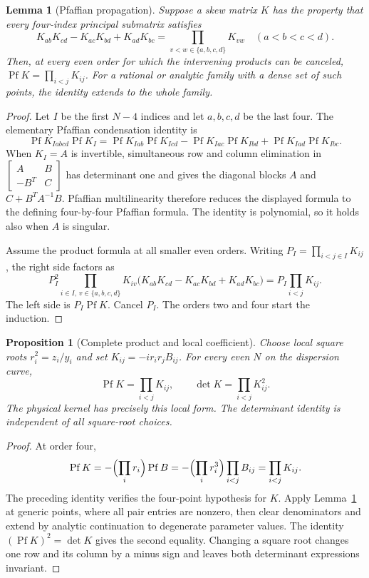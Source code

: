 \documentclass[11pt]{article}
\numberwithin{equation}{section}
\newtheorem{lemma}[theorem]{Lemma}
\newtheorem{proposition}[theorem]{Proposition}
\theoremstyle{remark}\newtheorem{remark}[theorem]{Remark}
\DeclareMathOperator{\Pf}{Pf}
\begin{document}
\begin{lemma}[Pfaffian propagation]\label{lem:pf-propagation}
Suppose a skew matrix $K$ has the property that every four-index
principal submatrix satisfies
\[
 K_{ab}K_{cd}-K_{ac}K_{bd}+K_{ad}K_{bc}
   =\prod_{v<w\in\{a,b,c,d\}}K_{vw}
 \quad(a<b<c<d).
\]
Then, at every even order for which the intervening products
can be canceled, $\operatorname{Pf}K=\prod_{i<j}K_{ij}$.
For a rational or analytic family with a dense set of such
points, the identity extends to the whole family.
\end{lemma}
\begin{proof}
Let $I$ be the first $N-4$ indices and let $a,b,c,d$ be the last
four.  The elementary Pfaffian condensation identity is
\[
 \operatorname{Pf}K_{Iabcd}\operatorname{Pf}K_I
 =\operatorname{Pf}K_{Iab}\operatorname{Pf}K_{Icd}
  -\operatorname{Pf}K_{Iac}\operatorname{Pf}K_{Ibd}
  +\operatorname{Pf}K_{Iad}\operatorname{Pf}K_{Ibc}.
\]
When $K_I=A$ is invertible, simultaneous
row and column elimination in
$\left[\begin{smallmatrix}A&B\\-B^T&C\end{smallmatrix}\right]$
has determinant one and gives the diagonal blocks
$A$ and $C+B^TA^{-1}B$.  Pfaffian multilinearity therefore
reduces the displayed formula to the defining four-by-four
Pfaffian formula.  The identity is polynomial, so it holds
also when $A$ is singular.

Assume the product formula at all smaller even orders.
Writing $P_I=\prod_{i<j\in I}K_{ij}$, the right side factors as
\[
 P_I^2\prod_{i\in I,\,v\in\{a,b,c,d\}}K_{iv}
 \bigl(K_{ab}K_{cd}-K_{ac}K_{bd}+K_{ad}K_{bc}\bigr)
 =P_I\prod_{i<j}K_{ij}.
\]
The left side is $P_I\operatorname{Pf}K$.  Cancel $P_I$.
The orders two and four start the induction.
\end{proof}

\begin{proposition}[Complete product and local coefficient]
\label{prop:complete-product}\label{prop:local-determinant-coefficient}
Choose local square roots $r_i^2=z_i/y_i$ and set
$K_{ij}=-ir_i r_j B_{ij}$.  For every even $N$ on the
dispersion curve,
\[
 \operatorname{Pf}K=\prod_{i<j}K_{ij},\qquad
 \det K=\prod_{i<j}K_{ij}^2.
\]
The physical kernel has precisely this local form.  The
determinant identity is independent of all square-root choices.
\end{proposition}
\begin{proof}
At order four,
\[
 \Pf K=-\Bigl(\prod_i r_i\Bigr)\Pf B
       =-\Bigl(\prod_i r_i^3\Bigr)\prod_{i<j}B_{ij}
       =\prod_{i<j}K_{ij}.
\]
The preceding identity verifies the four-point hypothesis for $K$.
Apply Lemma~\ref{lem:pf-propagation} at generic points, where all pair
entries are nonzero, then clear denominators and extend by analytic
continuation to degenerate parameter values. The identity
$(\operatorname{Pf}K)^2=\det K$ gives the second equality.
Changing a square root changes one row and its column by a
minus sign and leaves both determinant expressions invariant.
\end{proof}
\end{document}
